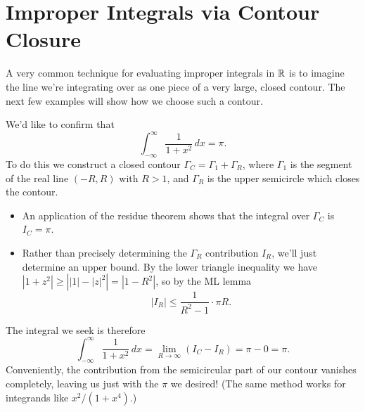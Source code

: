 \documentclass[../m136main.tex]{subfiles}
\begin{document}
\section{Improper Integrals via Contour Closure}
A very common technique for evaluating improper integrals in $\mathbb{R}$ is to imagine the line we're integrating over as one piece of a very large, closed contour.
The next few examples will show how we choose such a contour.

\begin{example}[A semicircle]
    We'd like to confirm that
    \[  \int_{-\infty}^{\infty} \frac{1}{1 + x^2} \,dx = \pi. \]
    To do this we construct a closed contour $\Gamma_C = \Gamma_1 + \Gamma_R$, where $\Gamma_1$ is the segment of the real line $(-R, R)$ with $R > 1$, and $\Gamma_R$ is the upper semicircle which closes the contour.
    \begin{itemize}[topsep=0pt]
        \item An application of the residue theorem shows that the integral over $\Gamma_C$ is $I_C = \pi$.
        
        \item Rather than precisely determining the $\Gamma_R$ contribution $I_R$, we'll just determine an upper bound.
        By the lower triangle inequality we have $|1 + z^2| \geq \left| |1| - |z|^2 \right| = |1 - R^2|$, so by the ML lemma
        \[ |I_R| \leq \frac{1}{R^2 - 1} \cdot \pi R. \]
    \end{itemize}   \vspace{-6pt}
    The integral we seek is therefore
    \[ \int_{-\infty}^{\infty} \frac{1}{1 + x^2} \,dx = \lim_{R \to \infty} (I_C - I_R) = \pi - 0 = \pi. \]
    Conveniently, the contribution from the semicircular part of our contour vanishes completely, leaving us just with the $\pi$ we desired!
    (The same method works for integrands like $x^2 / (1 + x^{4})$.)
\end{example}
\end{document}
